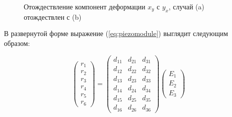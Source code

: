 \begin{figure}[H]
  \centering
  \hfill
  \caption{Отождествление компонент деформации $x_y$ с $y_x$, случай (a) отождествлен с (b)}
  \label{ris:2x_y_1}
\end{figure}

В развернутой форме выражение (\ref{eq:piezomodule}) выглядит следующим образом:

\begin{equation}
  \begin{pmatrix}
  r_1 \\
  r_2 \\
  r_3 \\
  r_4 \\
  r_5 \\
  r_6
  \end{pmatrix}
   = \begin{pmatrix}
  d_{11} & d_{21}  & d_{31} \\
  d_{12} & d_{22}  & d_{32} \\
  d_{13} & d_{23}  & d_{33} \\
  d_{14} & d_{24}  & d_{34} \\
  d_{15} & d_{25}  & d_{35} \\
  d_{16} & d_{26}  & d_{36}
  \end{pmatrix}
  \begin{pmatrix}
  E_1 \\
  E_2 \\
  E_3
  \end{pmatrix}
  \label{eq:piezomodule_matrica}
\end{equation}

